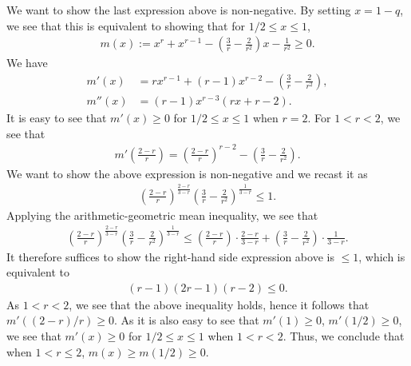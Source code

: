 \documentclass[11pt]{amsart}
\numberwithin{equation}{section}
\theoremstyle{definition}
\theoremstyle{remark}
\begin{document}
    We want to show the last expression above is non-negative. By setting $x=1-q$, we see that this is equivalent to showing that for $1/2 \leq x \leq 1$,
\begin{align}
\label{2.3}
   m(x) := x^r+x^{r-1}-\left (\frac 3r-\frac 2{r^2} \right )x-\frac 1{r^2} \geq 0.
\end{align}
    We have
\begin{align*}
   m'(x) &=rx^{r-1}+(r-1)x^{r-2}-\left (\frac 3r-\frac 2{r^2} \right ), \\
   m''(x) &=(r-1)x^{r-3}(rx+r-2).
\end{align*}
   It is easy to see that $m'(x)\geq 0$ for $1/2 \leq x \leq 1$ when $r=2$. For $1<r<2$, we see that
\begin{align*}
   m' \left(\frac {2-r}{r} \right )=\left ( \frac {2-r}{r} \right )^{r-2}-\left (\frac 3r-\frac 2{r^2} \right ).
\end{align*}
   We want to show the above expression is non-negative and we recast it as
\begin{align*}
   \left ( \frac {2-r}{r} \right )^{\frac {2-r}{3-r}}\left (\frac 3r-\frac 2{r^2} \right )^{\frac {1}{3-r}} \leq 1.
\end{align*}
   Applying the arithmetic-geometric mean inequality, we see that
\begin{align*}
   \left ( \frac {2-r}{r} \right )^{\frac {2-r}{3-r}}\left (\frac 3r-\frac 2{r^2} \right )^{\frac {1}{3-r}} \leq \left ( \frac {2-r}{r} \right )\cdot \frac {2-r}{3-r}+\left (\frac 3r-\frac 2{r^2} \right )\cdot \frac {1}{3-r} .
\end{align*}
    It therefore suffices to show the right-hand side expression above is $\leq 1$, which is equivalent to
\begin{align*}
  (r-1)(2r-1)(r-2) \leq 0.
\end{align*}
  As $1 < r < 2$, we see that the above inequality holds, hence it follows that $m'((2-r)/r) \geq 0$. As it is also easy to see that $m'(1) \geq 0$, $m'(1/2) \geq 0$, we see that $m'(x) \geq 0$ for $1/2 \leq x \leq 1$ when $1 < r < 2$. Thus, we conclude that when $1<r \leq 2$,
$m(x) \geq m(1/2) \geq 0$.
\end{document}
